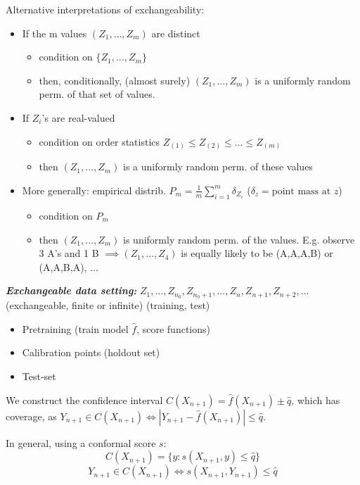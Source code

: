 Alternative interpretations of exchangeability:
\begin{itemize}
    \item If the m values $(Z_{1}, \dots, Z_{m})$ are distinct
    \begin{itemize}
        \item condition on $\{Z_{1}, \dots, Z_{m}\}$
        \item then, conditionally, (almost surely) $(Z_{1}, \dots, Z_{m})$ is a uniformly random perm. of that set of values.
    \end{itemize}
    \item If $Z_{i}$'s are real-valued
    \begin{itemize}
        \item condition on order statistics $Z_{(1)} \le Z_{(2)} \le \dots \le Z_{(m)}$
        \item then $(Z_{1}, \dots, Z_{m})$ is a uniformly random perm. of these values
    \end{itemize}
    \item More generally: empirical distrib. $\hat{P}_{m} = \frac{1}{m} \sum_{i=1}^{m} \delta_{Z_{i}}$ ($\delta_{z} = \text{point mass at } z$)
    \begin{itemize}
        \item condition on $\hat{P}_{m}$
        \item then $(Z_{1}, \dots, Z_{m})$ is uniformly random perm. of the values. E.g. observe 3 A's and 1 B $\implies (Z_{1}, \dots, Z_{4})$ is equally likely to be (A,A,A,B) or (A,A,B,A), $\dots$
    \end{itemize}
\end{itemize}


\emph{\textbf{Exchangeable data setting:}}
$Z_{1}, \dots, Z_{n_{0}}, Z_{n_{0}+1}, \dots, Z_{n}, Z_{n+1}, Z_{n+2}, \dots$ (exchangeable, finite or infinite)
(training, test)

\begin{itemize}
    \item Pretraining (train model $\hat{f}$, score functions)
    \item Calibration points (holdout set)
    \item Test-set
\end{itemize}

We construct the confidence interval $C(X_{n+1}) = \hat{f}(X_{n+1}) \pm \hat{q}$, which has coverage, as $Y_{n+1} \in C(X_{n+1}) \iff |Y_{n+1} - \hat{f}(X_{n+1})| \le \hat{q}$.

In general, using a conformal score $s$:
$$C(X_{n+1}) = \{y : s(X_{n+1}, y) \le \hat{q}\}$$
$$Y_{n+1} \in C(X_{n+1}) \iff s(X_{n+1}, Y_{n+1}) \le \hat{q}$$

